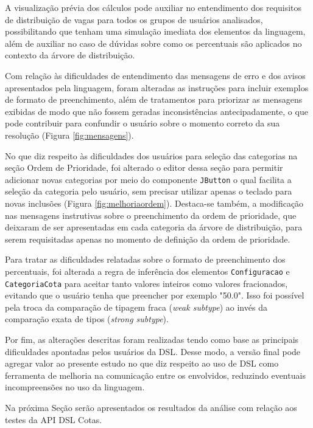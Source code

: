 \clearpage



A visualização prévia dos cálculos pode auxiliar no entendimento dos requisitos de distribuição de vagas para todos os grupos de usuários analisados, possibilitando que tenham uma simulação imediata dos elementos da linguagem, além de auxiliar no caso de dúvidas sobre como os percentuais são aplicados no contexto da árvore de distribuição.

Com relação às dificuldades de entendimento das mensagens de erro e dos avisos apresentados pela linguagem, foram alteradas as instruções para incluir exemplos de formato de preenchimento, além de tratamentos para priorizar as mensagens exibidas de modo que não fossem geradas inconsistências antecipadamente, o que pode contribuir para confundir o usuário sobre o momento correto da sua resolução (Figura \ref{fig:mensagens}).



No que diz respeito às dificuldades dos usuários para seleção das categorias na seção Ordem de Prioridade, foi alterado o editor dessa seção para permitir adicionar novas categorias por meio do componente \texttt{JButton} o qual facilita a seleção da categoria pelo usuário, sem precisar utilizar apenas o teclado para novas inclusões (Figura \ref{fig:melhoriaordem}). Destaca-se também, a modificação nas mensagens instrutivas sobre o preenchimento da ordem de prioridade, que deixaram de ser apresentadas em cada categoria da árvore de distribuição, para serem requisitadas apenas no momento de definição da ordem de prioridade.



Para tratar as dificuldades relatadas sobre o formato de preenchimento dos percentuais, foi alterada a regra de inferência dos elementos \texttt{Configuracao} e \texttt{CategoriaCota} para aceitar tanto valores inteiros como valores fracionados, evitando que o usuário tenha que preencher por exemplo "50.0". Isso foi possível pela troca da comparação de tipagem fraca (\textit{weak subtype}) ao invés da comparação exata de tipos (\textit{strong subtype}).



\newpage
Por fim, as alterações descritas foram realizadas tendo como base as principais dificuldades apontadas pelos usuários da DSL. Desse modo, a versão final pode agregar valor ao presente estudo no que diz respeito ao uso de DSL como ferramenta de melhoria na comunicação entre os envolvidos, reduzindo eventuais incompreensões no uso da linguagem.

Na próxima Seção serão apresentados os resultados da análise com relação aos testes da \gls{API} DSL Cotas.